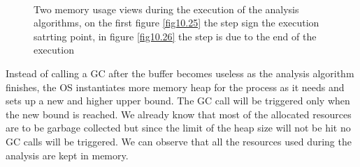 \begin{figure}[!htb]
	\centering
	\\
	\caption{Two memory usage views during the execution of the analysis algorithms, on the first figure \ref{fig10.25} the step sign the execution satrting point, in figure \ref{fig10.26} the step is due to the end of the execution}  
	\label{fig25.15ab}
\end{figure}
Instead of calling a GC after the buffer becomes useless as the analysis algorithm finishes, the OS instantiates more memory heap for the process as it needs and sets up a new and higher upper bound. The GC call will be triggered only when the new bound is reached. We already know that most of the allocated resources are to be garbage collected but since the limit of the heap size will not be hit no GC calls will be triggered. We can observe that all the resources used during  the analysis are kept in memory.
